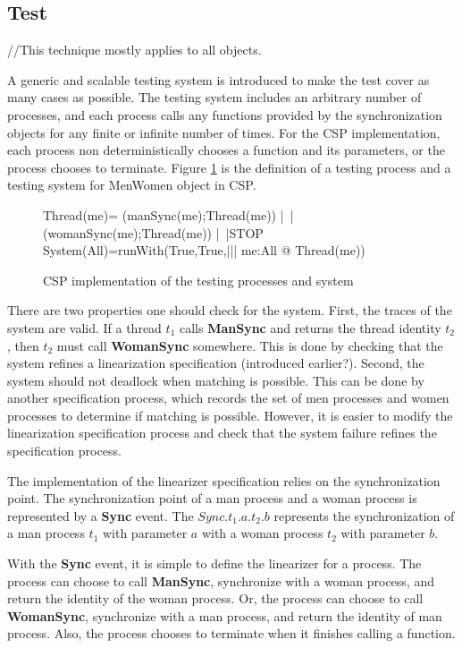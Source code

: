 \documentclass{article}
\begin{document}
\subsection{Test}
//This technique mostly applies to all objects.

A generic and scalable testing system is introduced to make the test cover as many cases as possible. The testing system includes an arbitrary number of processes, and each process calls any functions provided by the synchronization objects for any finite or infinite number of times. For the CSP implementation, each process non deterministically chooses a function and its parameters, or the process chooses to terminate. Figure \ref{menwomen.csp.testsystem} is the definition of a testing process and a testing system for MenWomen object in CSP.

\begin{figure}[hbtp]
\begin{cspm}
Thread(me)=
    (manSync(me);Thread(me))
 |~|(womanSync(me);Thread(me))
 |~|STOP
System(All)=runWith(True,True,||| me:All @ Thread(me))
\end{cspm}
\caption{CSP implementation of the testing processes and system}
\label{menwomen.csp.testsystem}
\end{figure}
  
There are two properties one should check for the system. First, the traces of the system are valid. If a thread $t_1$ calls \textbf{ManSync} and returns the thread identity $t_2$, then $t_2$ must call \textbf{WomanSync} somewhere. This is done by checking that the system refines a linearization specification (introduced earlier?). Second, the system should not deadlock when matching is possible. This can be done by another specification process, which records the set of men processes and women processes to determine if matching is possible. However, it is easier to modify the linearization specification process and check that the system failure refines the specification process.

The implementation of the linearizer specification relies on the synchronization point. The synchronization point of a man process and a woman process is represented by a \textbf{Sync} event. The $Sync.t_1.a.t_2.b$ represents the synchronization of a man process $t_1$ with parameter $a$ with a woman process $t_2$ with parameter $b$.

With the \textbf{Sync} event, it is simple to define the linearizer for a process. The process can choose to call \textbf{ManSync}, synchronize with a woman process, and return the identity of the woman process. Or, the process can choose to call \textbf{WomanSync}, synchronize with a man process, and return the identity of man process. Also, the process chooses to terminate when it finishes calling a function.
\end{document}

